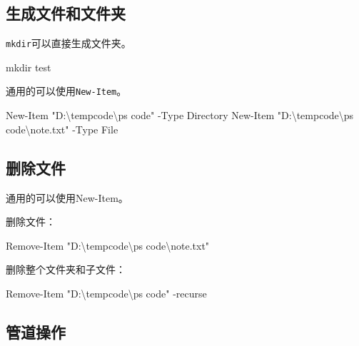 \documentclass[11pt]{ctexart}
\newenvironment{Shaded}{}{}
\newcommand{\StringTok}[1]{\textcolor[rgb]{0.25,0.44,0.63}{{#1}}}
\newcommand{\FunctionTok}[1]{\textcolor[rgb]{0.02,0.16,0.49}{{#1}}}
\newcommand{\NormalTok}[1]{{#1}}
\begin{document}
    \hypertarget{ux751fux6210ux6587ux4ef6ux548cux6587ux4ef6ux5939}{%
\subsection{生成文件和文件夹}\label{ux751fux6210ux6587ux4ef6ux548cux6587ux4ef6ux5939}}

\texttt{mkdir}可以直接生成文件夹。

\begin{Shaded}
\begin{Highlighting}[]
\NormalTok{mkdir test}
\end{Highlighting}
\end{Shaded}

通用的可以使用\texttt{New-Item}。

\begin{Shaded}
\begin{Highlighting}[]
\FunctionTok{New-Item} \StringTok{"D:\textbackslash{}tempcode\textbackslash{}ps code"}\NormalTok{ -Type Directory}
\FunctionTok{New-Item} \StringTok{"D:\textbackslash{}tempcode\textbackslash{}ps code\textbackslash{}note.txt"}\NormalTok{ -Type File}
\end{Highlighting}
\end{Shaded}

    \hypertarget{ux5220ux9664ux6587ux4ef6}{%
\subsection{删除文件}\label{ux5220ux9664ux6587ux4ef6}}

通用的可以使用New-Item。

删除文件：

\begin{Shaded}
\begin{Highlighting}[]
\FunctionTok{Remove-Item} \StringTok{"D:\textbackslash{}tempcode\textbackslash{}ps code\textbackslash{}note.txt"}
\end{Highlighting}
\end{Shaded}

删除整个文件夹和子文件：

\begin{Shaded}
\begin{Highlighting}[]
\FunctionTok{Remove-Item} \StringTok{"D:\textbackslash{}tempcode\textbackslash{}ps code"}\NormalTok{ -recurse}
\end{Highlighting}
\end{Shaded}

    \hypertarget{ux7ba1ux9053ux64cdux4f5c}{%
\subsection{管道操作}\label{ux7ba1ux9053ux64cdux4f5c}}
\end{document}
